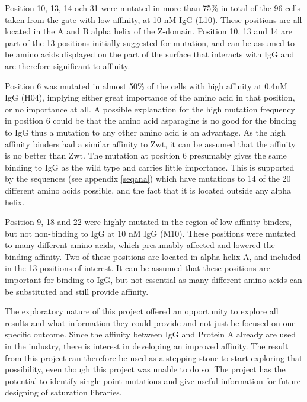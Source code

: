 \documentclass{article}
\begin{document}
\begin{multicols}{2}	
	
	Position 10, 13, 14 och 31 were mutated in more than 75\% in total of the 96 cells taken from the gate with low affinity, at 10 nM IgG (L10). These positions are all located in the A and B alpha helix of the Z-domain. Position 10, 13 and 14 are part of the 13 positions initially suggested for mutation, and can be assumed to be amino acids displayed on the part of the surface that interacts with IgG and are therefore significant to affinity.
	
	Position 6 was mutated in almost 50\% of the cells with high affinity at 0.4nM IgG (H04), implying either great importance of the amino acid in that position, or no importance at all. A possible explanation for the high mutation frequency in position 6 could be that the amino acid asparagine is no good for the binding to IgG thus a mutation to any other amino acid is an advantage. As the high affinity binders had a similar affinity to Zwt, it can be assumed that the affinity is no better than Zwt. The mutation at position 6 presumably gives the same binding to IgG as the wild type and carries little importance. This is supported by the sequences (see appendix \ref{seqana}) which have mutations to 14 of the 20 different amino acids possible, and the fact that it is located outside any alpha helix.
	
	Position 9, 18 and 22 were highly mutated in the region of low affinity binders, but not non-binding to IgG at 10 nM IgG (M10). These positions were mutated to many different amino acids, which presumably affected and lowered the binding affinity. Two of these positions are located in alpha helix A, and included in the 13 positions of interest. It can be assumed that these positions are important for binding to IgG, but not essential as many different amino acids can be substituted and still provide affinity.
	
	The exploratory nature of this project offered an opportunity to explore all results and what information they could provide and not just be focused on one specific outcome. Since the affinity between IgG and Protein A already are used in the industry, there is interest in developing an improved affinity. The result from this project can therefore be used as a stepping stone to start exploring that possibility, even though this project was unable to do so. The project has the potential to identify single-point mutations and give useful information for future designing of saturation libraries. 
	

\end{multicols}
\end{document}
